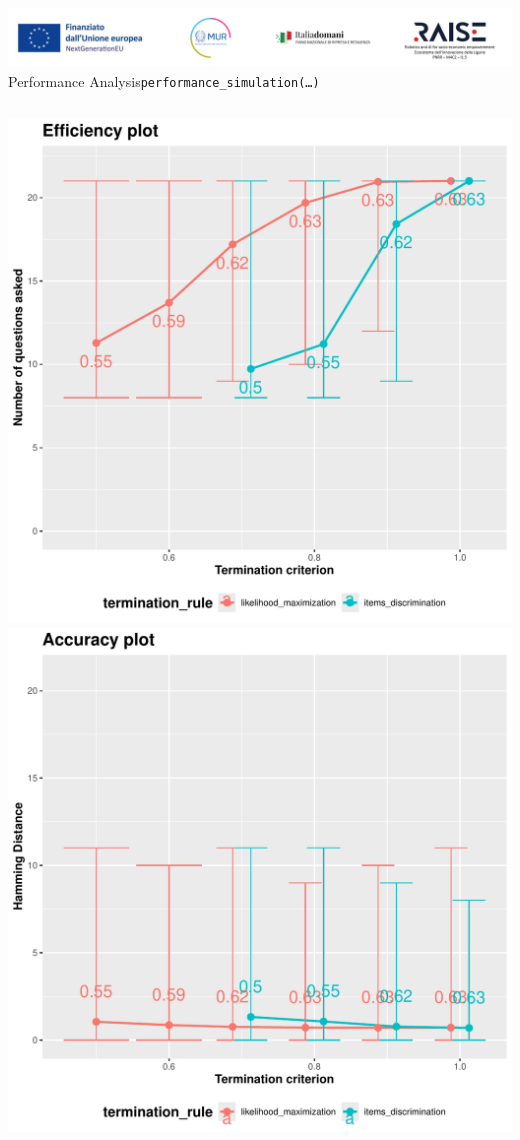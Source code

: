 \documentclass{beamer}
\begin{document}
\begin{frame}{\includegraphics[scale=0.4]{Da_cambiare.png} \\ 
Performance Analysis}{\texttt{performance\_simulation(\dots)}}
    \begin{columns}
     \includegraphics[scale=0.3]{Efficiency.pdf}
      \includegraphics[scale=0.3]{accuracy.pdf}   
     \end{columns}
\end{frame}
\end{document}
